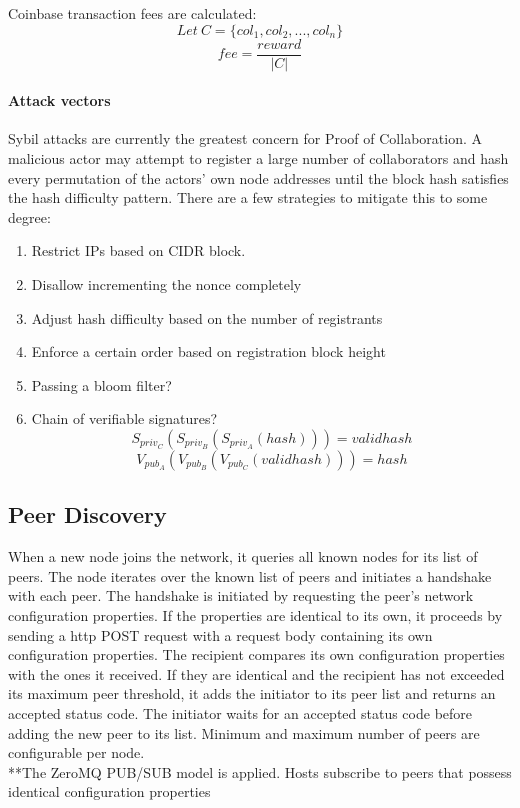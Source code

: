 \documentclass[10pt,twocolumn]{article}
\begin{document}
Coinbase transaction fees are calculated:
\[Let\ {C} = \{col_1,col_2,...,col_n\}\]
\[{fee}=\frac{reward}{|C|}\]

\paragraph{Attack vectors}
Sybil attacks are currently the greatest concern for Proof of Collaboration.  A malicious actor may attempt to register a large number of collaborators and hash every permutation of the actors' own node addresses until the block hash satisfies the hash difficulty pattern.  There are a few strategies to mitigate this to some degree:
\begin{enumerate}[noitemsep]
\item Restrict IPs based on CIDR block.
\item Disallow incrementing the nonce completely
\item Adjust hash difficulty based on the number of registrants
\item Enforce a certain order based on registration block height
\item Passing a bloom filter?
\item Chain of verifiable signatures?
\[S_{priv_C}(S_{priv_B}(S_{priv_A}(hash))) = {validhash}\]
\[V_{pub_A}(V_{pub_B}(V_{pub_C}(validhash))) = {hash}\]
\end{enumerate}

\subsection{Peer Discovery}
When a new node joins the network, it queries all known nodes for its list of peers.  The node iterates over the known list of peers and initiates a handshake with each peer.  The handshake is initiated by requesting the peer's network configuration properties.  If the properties are identical to its own, it proceeds by sending a http POST request with a request body containing its own configuration properties.  The recipient compares its own configuration properties with the ones it received.  If they are identical and the recipient has not exceeded its maximum peer threshold, it adds the initiator to its peer list and returns an accepted status code.  The initiator waits for an accepted status code before adding the new peer to its list.  Minimum and maximum number of peers are configurable per node.\\
**The ZeroMQ PUB/SUB model is applied.  Hosts subscribe to peers that possess identical configuration properties
\end{document}

